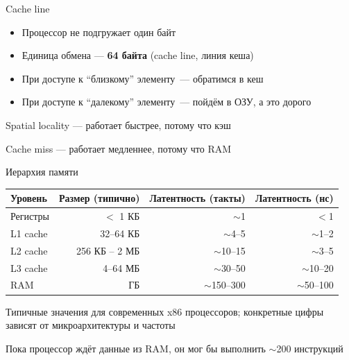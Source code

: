 \documentclass{../../slides-style}
\begin{document}
\begin{frame}{Cache line}
    \begin{itemize}
        \item Процессор не подгружает один байт
        \item Единица обмена --- \textbf{64 байта} (cache line, линия кеша)
        \item При доступе к \enquote{близкому} элементу~--- обратимся в кеш
        \item При доступе к \enquote{далекому} элементу~--- пойдём в ОЗУ, а это дорого
    \end{itemize}

    \bigskip
    Spatial locality --- работает быстрее, потому что кэш

    Cache miss --- работает медленнее, потому что RAM

\end{frame}

\begin{frame}{Иерархия памяти}
    \begin{center}
        \begin{scriptsize}
            \begin{tabular}{lrrr}
                \toprule
                Уровень  & Размер (типично) & Латентность (такты) & Латентность (нс) \\
                \midrule
                Регистры & $<$ 1 КБ         & $\sim$1             & $<$1             \\
                L1 cache & 32--64 КБ        & $\sim$4--5          & $\sim$1--2       \\
                L2 cache & 256 КБ -- 2 МБ   & $\sim$10--15        & $\sim$3--5       \\
                L3 cache & 4--64 МБ         & $\sim$30--50        & $\sim$10--20     \\
                RAM      & ГБ               & $\sim$150--300      & $\sim$50--100    \\
                \bottomrule
            \end{tabular}
        \end{scriptsize}
    \end{center}

    \smallskip
    {\tiny Типичные значения для современных x86 процессоров; конкретные цифры зависят от микроархитектуры и частоты}

    \bigskip

    Пока процессор ждёт данные из RAM, он мог бы выполнить $\sim$200 инструкций
\end{frame}
\end{document}

